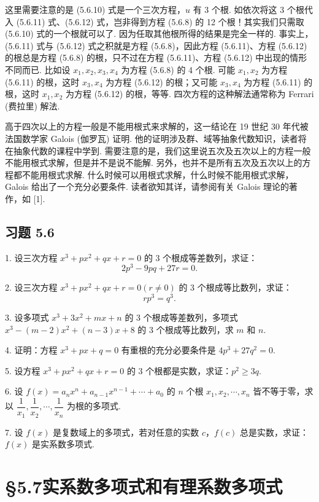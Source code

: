 \documentclass[UTF8,12pt,a4paper,fontset=fandol]{ctexart}
\begin{document}
这里需要注意的是 (5.6.10) 式是一个三次方程，$u$ 有 3 个根. 如依次将这 3 个根代入 (5.6.11) 式、(5.6.12) 式，岂非得到方程 (5.6.8) 的 12 个根！其实我们只需取 (5.6.10) 式的一个根就可以了. 因为任取其他根所得的结果是完全一样的. 事实上，(5.6.11) 式与 (5.6.12) 式之积就是方程 (5.6.8)，因此方程 (5.6.11)、方程 (5.6.12) 的根总是方程 (5.6.8) 的根，只不过在方程 (5.6.11)、方程 (5.6.12) 中出现的情形不同而已. 比如设 $x_1,x_2,x_3,x_4$ 为方程 (5.6.8) 的 4 个根. 可能 $x_1,x_2$ 为方程 (5.6.11) 的根，这时 $x_3,x_4$ 为方程 (5.6.12) 的根；又可能 $x_3,x_4$ 为方程 (5.6.11) 的根，这时 $x_1,x_2$ 为方程 (5.6.12) 的根，等等. 四次方程的这种解法通常称为 Ferrari (费拉里) 解法.

高于四次以上的方程一般是不能用根式来求解的，这一结论在 19 世纪 30 年代被法国数学家 Galois (伽罗瓦) 证明. 他的证明涉及群、域等抽象代数知识，读者将在抽象代数的课程中学到. 需要注意的是，我们这里说五次及五次以上的方程一般不能用根式求解，但是并不是说不能解. 另外，也并不是所有五次及五次以上的方程都不能用根式求解. 什么时候可以用根式求解，什么时候不能用根式求解，Galois 给出了一个充分必要条件. 读者欲知其详，请参阅有关 Galois 理论的著作，如 [1].

\subsection*{习题 5.6}

1. 设三次方程 $x^3+px^2+qx+r=0$ 的 3 个根成等差数列，求证：
\[
2p^3-9pq+27r=0.
\]

2. 设三次方程 $x^3+px^2+qx+r=0(r\neq 0)$ 的 3 个根成等比数列，求证：
\[
rp^3=q^3.
\]

3. 设多项式 $x^3+3x^2+mx+n$ 的 3 个根成等差数列，多项式 $x^3-(m-2)x^2+(n-3)x+8$ 的 3 个根成等比数列，求 $m$ 和 $n$.

4. 证明：方程 $x^3+px+q=0$ 有重根的充分必要条件是 $4p^3+27q^2=0$.

5. 设方程 $x^3+px^2+qx+r=0$ 的 3 个根都是实数，求证：$p^2\geq 3q$.

6. 设 $f(x)=a_nx^n+a_{n-1}x^{n-1}+\cdots+a_0$ 的 $n$ 个根 $x_1,x_2,\cdots,x_n$ 皆不等于零，求以 $\dfrac1{x_1},\dfrac1{x_2},\cdots,\dfrac1{x_n}$ 为根的多项式.

7. 设 $f(x)$ 是复数域上的多项式，若对任意的实数 $c$，$f(c)$ 总是实数，求证：$f(x)$ 是实系数多项式.

\section*{§5.7\quad 实系数多项式和有理系数多项式}
\end{document}
